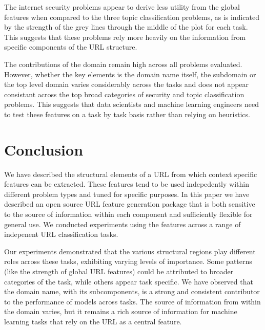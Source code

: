 \documentclass{aircc}
\begin{document}
The internet security problems appear to derive less utility from the global 
features when compared to the three topic classification problems, as is 
indicated by the strength of the grey lines through the middle of the plot 
for each task. This suggests that these problems rely more heavily on the 
information from specific components of the URL structure.

The contributions of the domain remain high across all problems evaluated. 
However, whether the key elements is the
domain name itself, the subdomain or the top level domain varies considerably 
across the tasks and does not appear consistant across the top broad categories 
of security and topic classification problems. 
This suggests that data scientists and machine learning engineers
need to test these features on a task by task basis rather than relying on heuristics.


\section{Conclusion}

We have described the structural elements of a URL from which context specific 
features can be extracted.
These features tend to be used indepedently within different problem types and 
tuned for specific purposes. 
In this paper we have described an open source URL feature generation package 
that is both sensitive to the 
source of information within each component and sufficiently flexible for general use. 
We conducted experiments
using the features across a range of indepenent URL classification tasks. 

Our experiments demonstrated that the various structural regions play different 
roles across these tasks, exhibiting varying levels of importance. 
Some patterns (like the strength of global URL features)
could be attributed to broader categories of the task, while others appear task specific.
We have observed that the domain name, with its subcomponents, is a strong and 
consistent contributor to the performance of models across tasks. The source of 
information from within the domain varies, but it remains
a rich source of information for machine learning tasks that rely on the URL as a 
central feature.




\end{document}
